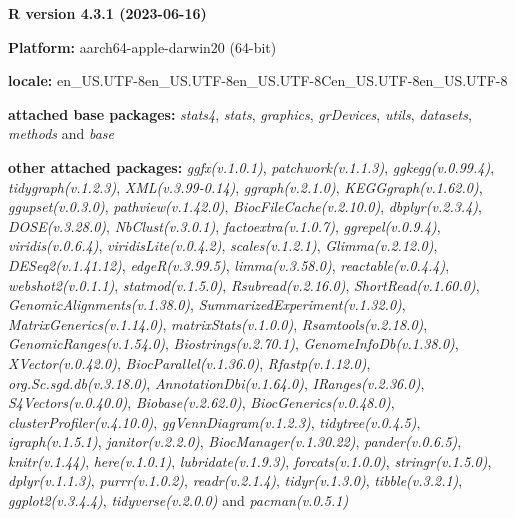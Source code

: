 \documentclass[
]{book}
\begin{document}
\textbf{R version 4.3.1 (2023-06-16)}

\textbf{Platform:} aarch64-apple-darwin20 (64-bit)

\textbf{locale:}
en\_US.UTF-8\textbar\textbar en\_US.UTF-8\textbar\textbar en\_US.UTF-8\textbar\textbar C\textbar\textbar en\_US.UTF-8\textbar\textbar en\_US.UTF-8

\textbf{attached base packages:}
\emph{stats4}, \emph{stats}, \emph{graphics}, \emph{grDevices}, \emph{utils}, \emph{datasets}, \emph{methods} and \emph{base}

\textbf{other attached packages:}
\emph{ggfx(v.1.0.1)}, \emph{patchwork(v.1.1.3)}, \emph{ggkegg(v.0.99.4)}, \emph{tidygraph(v.1.2.3)}, \emph{XML(v.3.99-0.14)}, \emph{ggraph(v.2.1.0)}, \emph{KEGGgraph(v.1.62.0)}, \emph{ggupset(v.0.3.0)}, \emph{pathview(v.1.42.0)}, \emph{BiocFileCache(v.2.10.0)}, \emph{dbplyr(v.2.3.4)}, \emph{DOSE(v.3.28.0)}, \emph{NbClust(v.3.0.1)}, \emph{factoextra(v.1.0.7)}, \emph{ggrepel(v.0.9.4)}, \emph{viridis(v.0.6.4)}, \emph{viridisLite(v.0.4.2)}, \emph{scales(v.1.2.1)}, \emph{Glimma(v.2.12.0)}, \emph{DESeq2(v.1.41.12)}, \emph{edgeR(v.3.99.5)}, \emph{limma(v.3.58.0)}, \emph{reactable(v.0.4.4)}, \emph{webshot2(v.0.1.1)}, \emph{statmod(v.1.5.0)}, \emph{Rsubread(v.2.16.0)}, \emph{ShortRead(v.1.60.0)}, \emph{GenomicAlignments(v.1.38.0)}, \emph{SummarizedExperiment(v.1.32.0)}, \emph{MatrixGenerics(v.1.14.0)}, \emph{matrixStats(v.1.0.0)}, \emph{Rsamtools(v.2.18.0)}, \emph{GenomicRanges(v.1.54.0)}, \emph{Biostrings(v.2.70.1)}, \emph{GenomeInfoDb(v.1.38.0)}, \emph{XVector(v.0.42.0)}, \emph{BiocParallel(v.1.36.0)}, \emph{Rfastp(v.1.12.0)}, \emph{org.Sc.sgd.db(v.3.18.0)}, \emph{AnnotationDbi(v.1.64.0)}, \emph{IRanges(v.2.36.0)}, \emph{S4Vectors(v.0.40.0)}, \emph{Biobase(v.2.62.0)}, \emph{BiocGenerics(v.0.48.0)}, \emph{clusterProfiler(v.4.10.0)}, \emph{ggVennDiagram(v.1.2.3)}, \emph{tidytree(v.0.4.5)}, \emph{igraph(v.1.5.1)}, \emph{janitor(v.2.2.0)}, \emph{BiocManager(v.1.30.22)}, \emph{pander(v.0.6.5)}, \emph{knitr(v.1.44)}, \emph{here(v.1.0.1)}, \emph{lubridate(v.1.9.3)}, \emph{forcats(v.1.0.0)}, \emph{stringr(v.1.5.0)}, \emph{dplyr(v.1.1.3)}, \emph{purrr(v.1.0.2)}, \emph{readr(v.2.1.4)}, \emph{tidyr(v.1.3.0)}, \emph{tibble(v.3.2.1)}, \emph{ggplot2(v.3.4.4)}, \emph{tidyverse(v.2.0.0)} and \emph{pacman(v.0.5.1)}
\end{document}
